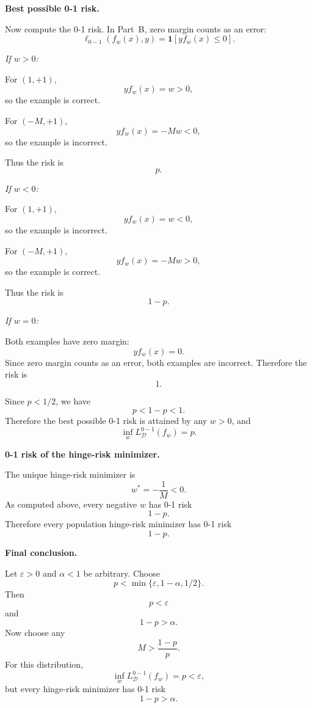 \documentclass[11pt]{article}
\newcommand{\eps}{\varepsilon}
\begin{document}
\begin{enumerate}
\begin{solutionbox}
    \medskip

    \textbf{Best possible 0-1 risk.}

    Now compute the 0-1 risk. In Part~B, zero margin counts as an error:
    \[
    \ell_{0-1}(f_w(x),y)=\mathbf{1}[yf_w(x)\le0].
    \]

    \textit{If $w>0$:}

    For $(1,+1)$,
    \[
    yf_w(x)=w>0,
    \]
    so the example is correct.

    For $(-M,+1)$,
    \[
    yf_w(x)=-Mw<0,
    \]
    so the example is incorrect.

    Thus the risk is
    \[
    p.
    \]

    \textit{If $w<0$:}

    For $(1,+1)$,
    \[
    yf_w(x)=w<0,
    \]
    so the example is incorrect.

    For $(-M,+1)$,
    \[
    yf_w(x)=-Mw>0,
    \]
    so the example is correct.

    Thus the risk is
    \[
    1-p.
    \]

    \textit{If $w=0$:}

    Both examples have zero margin:
    \[
    yf_w(x)=0.
    \]
    Since zero margin counts as an error, both examples are incorrect. Therefore the risk is
    \[
    1.
    \]

    Since $p<1/2$, we have
    \[
    p<1-p<1.
    \]
    Therefore the best possible 0-1 risk is attained by any $w>0$, and
    \[
    \boxed{
    \inf_w L_{\mathcal D}^{0-1}(f_w)=p.
    }
    \]

    \medskip

    \textbf{0-1 risk of the hinge-risk minimizer.}

    The unique hinge-risk minimizer is
    \[
    w^\ast=-\frac1M<0.
    \]
    As computed above, every negative $w$ has 0-1 risk
    \[
    1-p.
    \]
    Therefore every population hinge-risk minimizer has 0-1 risk
    \[
    \boxed{
    1-p.
    }
    \]

    \medskip

    \textbf{Final conclusion.}

    Let $\eps>0$ and $\alpha<1$ be arbitrary. Choose
    \[
    p<\min\{\eps,1-\alpha,1/2\}.
    \]
    Then
    \[
    p<\eps
    \]
    and
    \[
    1-p>\alpha.
    \]
    Now choose any
    \[
    M>\frac{1-p}{p}.
    \]
    For this distribution,
    \[
    \inf_w L_{\mathcal D}^{0-1}(f_w)=p<\eps,
    \]
    but every hinge-risk minimizer has 0-1 risk
    \[
    1-p>\alpha.
    \]


\end{solutionbox}
\end{enumerate}
\end{document}
